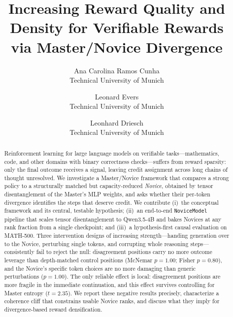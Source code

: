\documentclass[times, 10pt,twocolumn]{article}
\begin{document}
\title{Increasing Reward Quality and Density for Verifiable Rewards\\
       via Master/Novice Divergence}

\author{Ana Carolina Ramos Cunha\\
Technical University of Munich\\
\and
Leonard Evers\\
Technical University of Munich\\
\and
Leonhard Driesch\\
Technical University of Munich\\
}

\maketitle
\thispagestyle{empty}

\begin{abstract}
Reinforcement learning for large language models on verifiable tasks---mathematics,
code, and other domains with binary correctness checks---suffers from reward
sparsity: only the final outcome receives a signal, leaving credit assignment
across long chains of thought unresolved. We investigate a Master/Novice
framework that compares a strong policy to a structurally matched but
capacity-reduced \emph{Novice}, obtained by tensor disentanglement of the
Master's MLP weights, and asks whether their per-token divergence identifies
the steps that deserve credit. We contribute (i)~the conceptual framework and
its central, testable hypothesis; (ii)~an end-to-end \texttt{NoviceModel}
pipeline that scales tensor disentanglement to Qwen3.5-4B and bakes Novices at
any rank fraction from a single checkpoint; and (iii)~a hypothesis-first
causal evaluation on MATH-500. Three intervention designs of
increasing strength---handing generation over to the Novice, perturbing single
tokens, and corrupting whole reasoning steps---consistently fail to reject the
null: disagreement positions carry no more outcome leverage than depth-matched
control positions (McNemar $p{=}1.00$; Fisher $p{=}0.80$), and the Novice's
specific token choices are no more damaging than generic perturbations
($p{=}1.00$). The only reliable effect is local: disagreement positions are
more fragile in the immediate continuation, and this effect survives
controlling for Master entropy ($t{=}2.35$). We report these negative results
precisely, characterize a coherence cliff that constrains usable Novice ranks,
and discuss what they imply for divergence-based reward densification.
\end{abstract}
\end{document}
